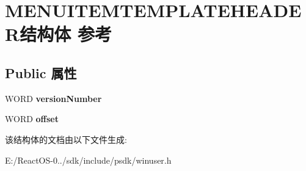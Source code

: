 \hypertarget{struct_m_e_n_u_i_t_e_m_t_e_m_p_l_a_t_e_h_e_a_d_e_r}{}\section{M\+E\+N\+U\+I\+T\+E\+M\+T\+E\+M\+P\+L\+A\+T\+E\+H\+E\+A\+D\+E\+R结构体 参考}
\label{struct_m_e_n_u_i_t_e_m_t_e_m_p_l_a_t_e_h_e_a_d_e_r}
\subsection*{Public 属性}
\begin{DoxyCompactItemize}
\item 
\mbox{\label{struct_m_e_n_u_i_t_e_m_t_e_m_p_l_a_t_e_h_e_a_d_e_r_a0b842ca6c8f087424cf7850e80c8882d}} 
W\+O\+RD {\bfseries version\+Number}
\item 
\mbox{\label{struct_m_e_n_u_i_t_e_m_t_e_m_p_l_a_t_e_h_e_a_d_e_r_a5a3a1828998e819749702b7a0b175399}} 
W\+O\+RD {\bfseries offset}
\end{DoxyCompactItemize}


该结构体的文档由以下文件生成\+:\begin{DoxyCompactItemize}
\item 
E\+:/\+React\+O\+S-\/0../sdk/include/psdk/winuser.\+h\end{DoxyCompactItemize}
